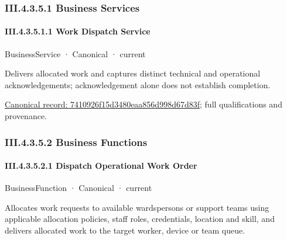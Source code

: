 \subsubsection*{III.4.3.5.1 Business Services}
\label{navigation:III.4.3.5.1}

\paragraph*{III.4.3.5.1.1 Work Dispatch Service}
\label{navigation:III.4.3.5.1.1}

\label{element:7410926f15d3480eaa856d998d67d83f}
{\small BusinessService · Canonical · current}\par

Delivers allocated work and captures distinct technical and operational acknowledgements; acknowledgement alone does not establish completion.


{\footnotesize \href{../../../../../../../../continuum/business/business-service/7410926f15d3480eaa856d998d67d83f.md}{Canonical record: 7410926f15d3480eaa856d998d67d83f}; full qualifications and provenance.}\par
\subsubsection*{III.4.3.5.2 Business Functions}
\label{navigation:III.4.3.5.2}

\paragraph*{III.4.3.5.2.1 Dispatch Operational Work Order}
\label{navigation:III.4.3.5.2.1}

\label{element:05a14489d3e943499581620356130007}
{\small BusinessFunction · Canonical · current}\par

Allocates work requests to available wardspersons or support teams using applicable allocation policies, staff roles, credentials, location and skill, and delivers allocated work to the target worker, device or team queue.


